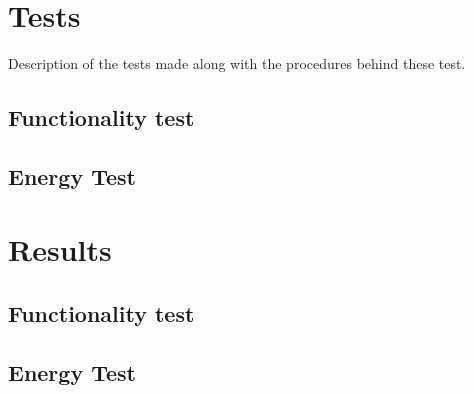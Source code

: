\section{Tests}
Description of the tests made along with the procedures behind these test.

\subsection{Functionality test}

\subsection{Energy Test}

\section{Results}

\subsection{Functionality test}

\subsection{Energy Test}